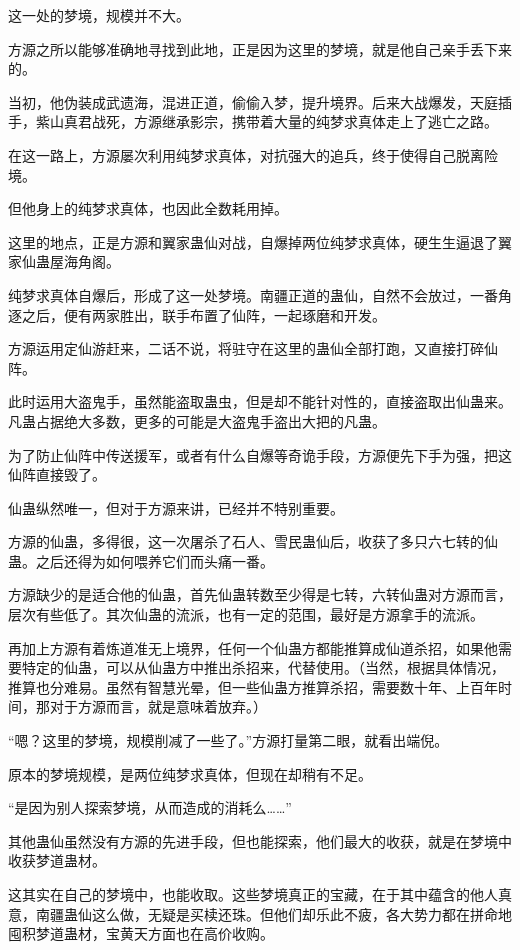 
\begin{this_body}

这一处的梦境，规模并不大。

方源之所以能够准确地寻找到此地，正是因为这里的梦境，就是他自己亲手丢下来的。

当初，他伪装成武遗海，混进正道，偷偷入梦，提升境界。后来大战爆发，天庭插手，紫山真君战死，方源继承影宗，携带着大量的纯梦求真体走上了逃亡之路。

在这一路上，方源屡次利用纯梦求真体，对抗强大的追兵，终于使得自己脱离险境。

但他身上的纯梦求真体，也因此全数耗用掉。

这里的地点，正是方源和翼家蛊仙对战，自爆掉两位纯梦求真体，硬生生逼退了翼家仙蛊屋海角阁。

纯梦求真体自爆后，形成了这一处梦境。南疆正道的蛊仙，自然不会放过，一番角逐之后，便有两家胜出，联手布置了仙阵，一起琢磨和开发。

方源运用定仙游赶来，二话不说，将驻守在这里的蛊仙全部打跑，又直接打碎仙阵。

此时运用大盗鬼手，虽然能盗取蛊虫，但是却不能针对性的，直接盗取出仙蛊来。凡蛊占据绝大多数，更多的可能是大盗鬼手盗出大把的凡蛊。

为了防止仙阵中传送援军，或者有什么自爆等奇诡手段，方源便先下手为强，把这仙阵直接毁了。

仙蛊纵然唯一，但对于方源来讲，已经并不特别重要。

方源的仙蛊，多得很，这一次屠杀了石人、雪民蛊仙后，收获了多只六七转的仙蛊。之后还得为如何喂养它们而头痛一番。

方源缺少的是适合他的仙蛊，首先仙蛊转数至少得是七转，六转仙蛊对方源而言，层次有些低了。其次仙蛊的流派，也有一定的范围，最好是方源拿手的流派。

再加上方源有着炼道准无上境界，任何一个仙蛊方都能推算成仙道杀招，如果他需要特定的仙蛊，可以从仙蛊方中推出杀招来，代替使用。（当然，根据具体情况，推算也分难易。虽然有智慧光晕，但一些仙蛊方推算杀招，需要数十年、上百年时间，那对于方源而言，就是意味着放弃。）

“嗯？这里的梦境，规模削减了一些了。”方源打量第二眼，就看出端倪。

原本的梦境规模，是两位纯梦求真体，但现在却稍有不足。

“是因为别人探索梦境，从而造成的消耗么……”

其他蛊仙虽然没有方源的先进手段，但也能探索，他们最大的收获，就是在梦境中收获梦道蛊材。

这其实在自己的梦境中，也能收取。这些梦境真正的宝藏，在于其中蕴含的他人真意，南疆蛊仙这么做，无疑是买椟还珠。但他们却乐此不疲，各大势力都在拼命地囤积梦道蛊材，宝黄天方面也在高价收购。


\end{this_body}
